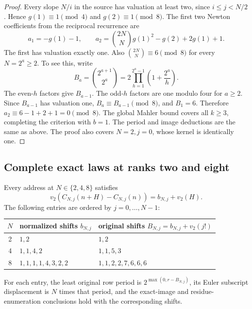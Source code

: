 \begin{proof}
Every slope $N/i$ in the source has valuation at least two, since
$i\leq j<N/2$. Hence $g(1)\equiv1\pmod4$ and
$g(2)\equiv1\pmod8$. The first two Newton coefficients from the
reciprocal recurrence are
\begin{equation}
 a_1=-g(1)-1,\qquad
 a_2=\binom{2N}{N}g(1)^2-g(2)+2g(1)+1.
 \label{eq:lower-half-initial-newton}
\end{equation}
The first has valuation exactly one. Also
$\binom{2N}{N}\equiv6\pmod8$ for every $N=2^a\geq2$.
To see this, write
\[
 B_a=\binom{2^{a+1}}{2^a}
       =2\prod_{h=1}^{2^a-1}\left(1+\frac{2^a}{h}\right).
\]
The even-$h$ factors give $B_{a-1}$. The odd-$h$ factors are one
modulo four for $a\geq2$. Since $B_{a-1}$ has valuation one,
$B_a\equiv B_{a-1}\pmod8$, and $B_1=6$.
Therefore $a_2\equiv6-1+2+1=0\pmod8$.
The global Mahler bound covers all $k\geq3$, completing the criterion
with $b=1$. The period and image deductions are the same as above.
The proof also covers $N=2,j=0$, whose kernel is identically one.
\end{proof}

\subsection{Complete exact laws at ranks two and eight}

\begin{proposition}
\label{prop:two-four-eight-isometry-table}
Every address at $N\in\{2,4,8\}$ satisfies
\[
 v_2(C_{N,j}(n+H)-C_{N,j}(n))=b_{N,j}+v_2(H).
\]
The following entries are ordered by $j=0,\ldots,N-1$:
\begin{center}
\begin{tabular}{c l l}
$N$&normalized shifts $b_{N,j}$&original shifts $B_{N,j}=b_{N,j}+v_2(j!)$\\\hline
2&$1,2$&$1,2$\\
4&$1,1,4,2$&$1,1,5,3$\\
8&$1,1,1,1,4,3,2,2$&$1,1,2,2,7,6,6,6$
\end{tabular}
\end{center}
For each entry, the least original row period is
$2^{\max(0,r-B_{N,j})}$, its Euler subscript displacement is $N$ times
that period, and the exact-image and residue-enumeration conclusions
hold with the corresponding shifts.
\end{proposition}

